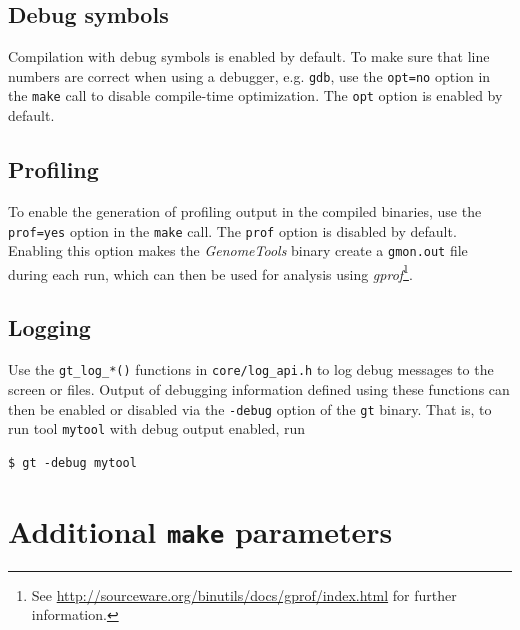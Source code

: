 \documentclass[11pt,final]{article}
\newcommand{\keyword}[1]{\lstinline{#1}}
\newcommand{\Gt}[0]{\emph{GenomeTools}\xspace}
\begin{document}
\subsection{Debug symbols}
Compilation with debug symbols is enabled by default.
To make sure that line numbers are correct when using a debugger, e.g. 
\keyword{gdb}, use the \keyword{opt=no} option in the \keyword{make} call to
disable compile-time optimization. The \keyword{opt} option is enabled by
default.

\subsection{Profiling}
To enable the generation of profiling output in the compiled binaries, use the
\keyword{prof=yes} option in the \keyword{make} call. The \keyword{prof} option
is disabled by default. Enabling this option makes the \Gt binary create a
\keyword{gmon.out} file during each run, which can then be used for analysis
using \emph{gprof}\footnote{See
\url{http://sourceware.org/binutils/docs/gprof/index.html} for further
information.}.

\subsection{Logging}
Use the \keyword{gt_log_*()} functions in \keyword{core/log_api.h} to log
debug messages to the screen or files. Output of debugging information defined using
these functions can then be enabled or disabled via the \keyword{-debug} option
of the \keyword{gt} binary.
That is, to run tool \keyword{mytool} with debug output enabled, run

\begin{lstlisting}
$ gt -debug mytool
\end{lstlisting}%

\section{Additional \keyword{make} parameters}
\end{document}
